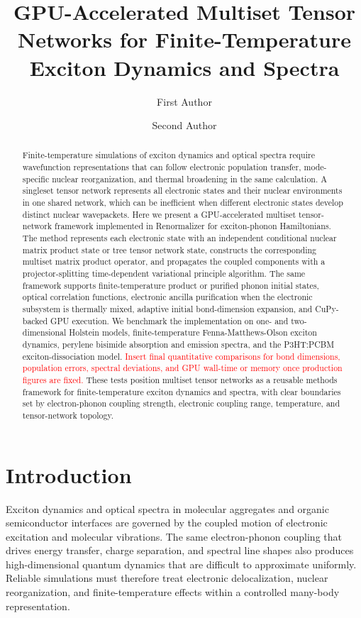 \documentclass[journal=jctcce,manuscript=article]{achemso}
\title{GPU-Accelerated Multiset Tensor Networks for Finite-Temperature Exciton Dynamics and Spectra}
\author{First Author}
\affiliation{Department, Institution, City, Postal Code, Country}
\author{Second Author}
\affiliation{Department, Institution, City, Postal Code, Country}
\newcommand{\placeholder}[1]{\textcolor{red}{#1}}
\begin{document}
\begin{abstract}
Finite-temperature simulations of exciton dynamics and optical spectra require wavefunction representations that can follow electronic population transfer, mode-specific nuclear reorganization, and thermal broadening in the same calculation. A singleset tensor network represents all electronic states and their nuclear environments in one shared network, which can be inefficient when different electronic states develop distinct nuclear wavepackets. Here we present a GPU-accelerated multiset tensor-network framework implemented in Renormalizer for exciton-phonon Hamiltonians. The method represents each electronic state with an independent conditional nuclear matrix product state or tree tensor network state, constructs the corresponding multiset matrix product operator, and propagates the coupled components with a projector-splitting time-dependent variational principle algorithm. The same framework supports finite-temperature product or purified phonon initial states, optical correlation functions, electronic ancilla purification when the electronic subsystem is thermally mixed, adaptive initial bond-dimension expansion, and CuPy-backed GPU execution. We benchmark the implementation on one- and two-dimensional Holstein models, finite-temperature Fenna-Matthews-Olson exciton dynamics, perylene bisimide absorption and emission spectra, and the P3HT:PCBM exciton-dissociation model. \placeholder{Insert final quantitative comparisons for bond dimensions, population errors, spectral deviations, and GPU wall-time or memory once production figures are fixed.} These tests position multiset tensor networks as a reusable methods framework for finite-temperature exciton dynamics and spectra, with clear boundaries set by electron-phonon coupling strength, electronic coupling range, temperature, and tensor-network topology.
\end{abstract}

\maketitle

\section{Introduction}

Exciton dynamics and optical spectra in molecular aggregates and organic semiconductor interfaces are governed by the coupled motion of electronic excitation and molecular vibrations. The same electron-phonon coupling that drives energy transfer, charge separation, and spectral line shapes also produces high-dimensional quantum dynamics that are difficult to approximate uniformly. Reliable simulations must therefore treat electronic delocalization, nuclear reorganization, and finite-temperature effects within a controlled many-body representation.
\end{document}
